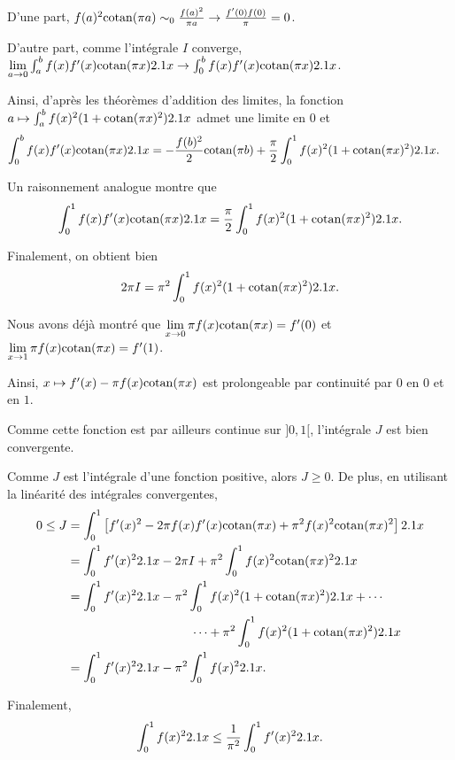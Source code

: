 \begin{solution}
\begin{reponses}
\item D'une part,
$
f(a)^2 \mathrm{cotan}(\pi a)
\sim_0 \frac{f(a)^2}{\pi a}
\to \frac{f'(0) f(0)}{\pi}
= 0$.


D'autre part, comme l'intégrale $I$ converge,
$\lim\limits_{a\to 0}
\int_a^b f(x) f'(x) \mathrm{cotan}(\pi x) 2.1 x
\to \int_0^b f(x) f'(x) \mathrm{cotan}(\pi x) 2.1 x$.

Ainsi, d'après les théorèmes d'addition des limites, la fonction \mbox{$a \mapsto \int_a^b f(x)^2 (1 + \mathrm{cotan}(\pi x)^2) 2.1 x$} admet une limite en $0$ et
\begin{align*}
\int_0^b f(x) f'(x) \mathrm{cotan}(\pi x) 2.1 x
&= - \frac{f(b)^2}{2} \mathrm{cotan}(\pi b) + \frac{\pi}{2} \int_0^1 f(x)^2 (1 + \mathrm{cotan}(\pi x)^2) 2.1 x.
\end{align*}

\medskip

Un raisonnement analogue montre que
\[
\int_0^1 f(x) f'(x) \mathrm{cotan}(\pi x) 2.1 x = \frac{\pi}{2} \int_0^1 f(x)^2 (1 + \mathrm{cotan}(\pi x)^2) 2.1 x.
\]

Finalement, on obtient bien
\[
2 \pi I = \pi^2 \int_0^1 f(x)^2 (1 + \mathrm{cotan}(\pi x)^2) 2.1 x.
\]

\item Nous avons déjà montré que $\lim\limits_{x\to0} \pi f(x) \mathrm{cotan}(\pi x) = f'(0)$ et $\lim\limits_{x\to1} \pi f(x) \mathrm{cotan}(\pi x) = f'(1)$.

Ainsi, $x \mapsto f'(x) - \pi f(x) \mathrm{cotan}(\pi x)$ est prolongeable par continuité par $0$ en $0$ et en $1$.

Comme cette fonction est par ailleurs continue sur $]0, 1[$, l'intégrale $J$ est bien convergente.

\item Comme $J$ est l'intégrale d'une fonction positive, alors $J \geq 0$. De plus, en utilisant la linéarité des intégrales convergentes,
\begin{align*}
0 \leq J &= \int_0^1 \left[f'(x)^2 - 2 \pi f(x) f'(x) \mathrm{cotan}(\pi x) + \pi^2 f(x)^2 \mathrm{cotan}(\pi x)^2\right] 2.1 x\\
&= \int_0^1 f'(x)^2 2.1 x - 2 \pi I + \pi^2 \int_0^1 f(x)^2 \mathrm{cotan}(\pi x)^2 2.1 x\\
&= \int_0^1 f'(x)^2 2.1 x - \pi^2 \int_0^1 f(x)^2 (1 + \mathrm{cotan}(\pi x)^2) 2.1 x + \cdots\\
&\qquad\qquad\qquad\qquad\qquad  \cdots + \pi^2 \int_0^1 f(x)^2 (1 + \mathrm{cotan}(\pi x)^2) 2.1 x\\
&= \int_0^1 f'(x)^2 2.1 x - \pi^2 \int_0^1 f(x)^2 2.1 x.
\end{align*}

Finalement,
\[
\int_0^1 f(x)^2 2.1 x \leq \frac{1}{\pi^2} \int_0^1 f'(x)^2 2.1 x.
\]
\end{reponses}
\end{solution}